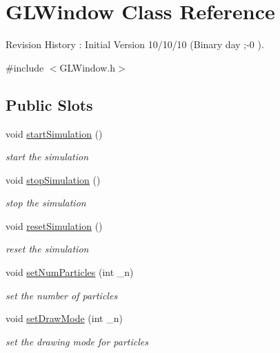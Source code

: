 \hypertarget{classGLWindow}{
\section{GLWindow Class Reference}
\label{classGLWindow}
}


Revision History : Initial Version 10/10/10 (Binary day ;-\/0 ).  


{\ttfamily \#include $<$GLWindow.h$>$}\subsection*{Public Slots}
\begin{DoxyCompactItemize}
\item 
void \hyperlink{classGLWindow_a9d5782bf444d2f14c3244ca295b63545}{startSimulation} ()
\begin{DoxyCompactList}\small\item\em start the simulation \item\end{DoxyCompactList}\item 
void \hyperlink{classGLWindow_a2fe0c3f972cf0614b6b90e43724160f8}{stopSimulation} ()
\begin{DoxyCompactList}\small\item\em stop the simulation \item\end{DoxyCompactList}\item 
void \hyperlink{classGLWindow_a768d9717b3f5ed181fc8817481419d50}{resetSimulation} ()
\begin{DoxyCompactList}\small\item\em reset the simulation \item\end{DoxyCompactList}\item 
void \hyperlink{classGLWindow_ab1b577a3ef506608f04a061db070799d}{setNumParticles} (int \_\-n)
\begin{DoxyCompactList}\small\item\em set the number of particles \item\end{DoxyCompactList}\item 
void \hyperlink{classGLWindow_a1d5f9891101b89f3d220c44b7fa5d68d}{setDrawMode} (int \_\-n)
\begin{DoxyCompactList}\small\item\em set the drawing mode for particles \item\end{DoxyCompactList}\item 

\end{DoxyCompactItemize}
